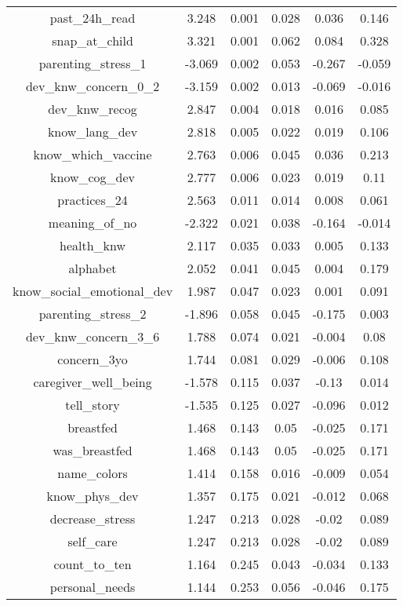 \begin{table}[!htbp]
\begin{tabular}{@{\extracolsep{5pt}} cccccc}
past\_24h\_read & 3.248 & 0.001 & 0.028 & 0.036 & 0.146 \\ 
snap\_at\_child & 3.321 & 0.001 & 0.062 & 0.084 & 0.328 \\ 
parenting\_stress\_1 & -3.069 & 0.002 & 0.053 & -0.267 & -0.059 \\ 
dev\_knw\_concern\_0\_2 & -3.159 & 0.002 & 0.013 & -0.069 & -0.016 \\ 
dev\_knw\_recog & 2.847 & 0.004 & 0.018 & 0.016 & 0.085 \\ 
know\_lang\_dev & 2.818 & 0.005 & 0.022 & 0.019 & 0.106 \\ 
know\_which\_vaccine & 2.763 & 0.006 & 0.045 & 0.036 & 0.213 \\ 
know\_cog\_dev & 2.777 & 0.006 & 0.023 & 0.019 & 0.11 \\ 
practices\_24 & 2.563 & 0.011 & 0.014 & 0.008 & 0.061 \\ 
meaning\_of\_no & -2.322 & 0.021 & 0.038 & -0.164 & -0.014 \\ 
health\_knw & 2.117 & 0.035 & 0.033 & 0.005 & 0.133 \\ 
alphabet & 2.052 & 0.041 & 0.045 & 0.004 & 0.179 \\ 
know\_social\_emotional\_dev & 1.987 & 0.047 & 0.023 & 0.001 & 0.091 \\ 
parenting\_stress\_2 & -1.896 & 0.058 & 0.045 & -0.175 & 0.003 \\ 
dev\_knw\_concern\_3\_6 & 1.788 & 0.074 & 0.021 & -0.004 & 0.08 \\ 
concern\_3yo & 1.744 & 0.081 & 0.029 & -0.006 & 0.108 \\ 
caregiver\_well\_being & -1.578 & 0.115 & 0.037 & -0.13 & 0.014 \\ 
tell\_story & -1.535 & 0.125 & 0.027 & -0.096 & 0.012 \\ 
breastfed & 1.468 & 0.143 & 0.05 & -0.025 & 0.171 \\ 
was\_breastfed & 1.468 & 0.143 & 0.05 & -0.025 & 0.171 \\ 
name\_colors & 1.414 & 0.158 & 0.016 & -0.009 & 0.054 \\ 
know\_phys\_dev & 1.357 & 0.175 & 0.021 & -0.012 & 0.068 \\ 
decrease\_stress & 1.247 & 0.213 & 0.028 & -0.02 & 0.089 \\ 
self\_care & 1.247 & 0.213 & 0.028 & -0.02 & 0.089 \\ 
count\_to\_ten & 1.164 & 0.245 & 0.043 & -0.034 & 0.133 \\ 
personal\_needs & 1.144 & 0.253 & 0.056 & -0.046 & 0.175 \\ 

\end{tabular}
\end{table}

